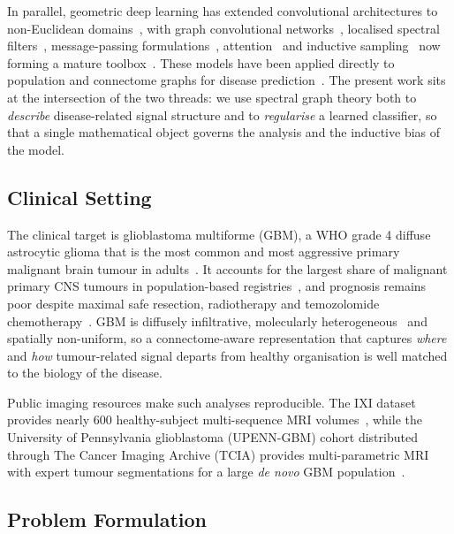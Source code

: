 \documentclass[11pt,reqno]{amsart}
\theoremstyle{plain}
\theoremstyle{definition}
\theoremstyle{remark}
\numberwithin{equation}{section}
\begin{document}
In parallel, geometric deep learning has extended convolutional architectures to
non-Euclidean domains~\cite{bronstein2017geometric,bronstein2021geometric}, with
graph convolutional networks~\cite{kipf2017semi}, localised spectral
filters~\cite{defferrard2016convolutional}, message-passing
formulations~\cite{gilmer2017neural}, attention~\cite{velickovic2018graph} and
inductive sampling~\cite{hamilton2017inductive} now forming a mature
toolbox~\cite{wu2021comprehensive,xu2019powerful}. These models have been
applied directly to population and connectome graphs for disease
prediction~\cite{parisot2018disease,ktena2018metric,li2021braingnn}. The present
work sits at the intersection of the two threads: we use spectral graph theory
both to \emph{describe} disease-related signal structure and to \emph{regularise}
a learned classifier, so that a single mathematical object governs the analysis
and the inductive bias of the model.

\subsection{Clinical Setting}

The clinical target is glioblastoma multiforme (GBM), a WHO grade 4 diffuse
astrocytic glioma that is the most common and most aggressive primary malignant
brain tumour in adults~\cite{louis2021who,wen2008malignant}. It accounts for the
largest share of malignant primary CNS tumours in population-based
registries~\cite{ostrom2023cbtrus}, and prognosis remains poor despite maximal
safe resection, radiotherapy and temozolomide
chemotherapy~\cite{stupp2005radiotherapy}. GBM is diffusely infiltrative,
molecularly heterogeneous~\cite{verhaak2010integrated} and spatially
non-uniform, so a connectome-aware representation that captures \emph{where} and
\emph{how} tumour-related signal departs from healthy organisation is well
matched to the biology of the disease.

Public imaging resources make such analyses reproducible. The IXI dataset
provides nearly $600$ healthy-subject multi-sequence MRI
volumes~\cite{ixi_dataset}, while the University of Pennsylvania glioblastoma
(UPENN-GBM) cohort distributed through The Cancer Imaging Archive (TCIA)
provides multi-parametric MRI with expert tumour segmentations for a large
\emph{de novo} GBM population~\cite{bakas2022university,upenngbm_tcia,
clark2013cancer}.

\subsection{Problem Formulation}
\end{document}
